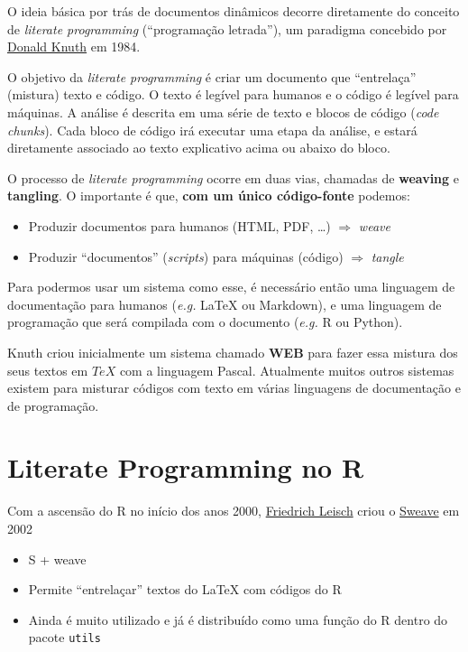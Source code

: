 \documentclass[10pt,a4paper]{book}
\providecommand{\tightlist}{%
  \setlength{\itemsep}{0pt}\setlength{\parskip}{0pt}}
\begin{document}
O ideia básica por trás de documentos dinâmicos decorre diretamente do
conceito de \emph{literate programming} (``programação letrada''), um
paradigma concebido por
\href{https://en.wikipedia.org/wiki/Donald_Knuth}{Donald Knuth} em 1984.

O objetivo da \emph{literate programming} é criar um documento que
``entrelaça'' (mistura) texto e código. O texto é legível para humanos e
o código é legível para máquinas. A análise é descrita em uma série de
texto e blocos de código (\emph{code chunks}). Cada bloco de código irá
executar uma etapa da análise, e estará diretamente associado ao texto
explicativo acima ou abaixo do bloco.

O processo de \emph{literate programming} ocorre em duas vias, chamadas
de \textbf{weaving} e \textbf{tangling}. O importante é que, \textbf{com
um único código-fonte} podemos:

\begin{itemize}
\tightlist
\item
  Produzir documentos para humanos (HTML, PDF, \ldots{}) \(\Rightarrow\)
  \emph{weave}
\item
  Produzir ``documentos'' (\emph{scripts}) para máquinas (código)
  \(\Rightarrow\) \emph{tangle}
\end{itemize}

Para podermos usar um sistema como esse, é necessário então uma
linguagem de documentação para humanos (\emph{e.g.} LaTeX ou Markdown),
e uma linguagem de programação que será compilada com o documento
(\emph{e.g.} R ou Python).

Knuth criou inicialmente um sistema chamado \textbf{WEB} para fazer essa
mistura dos seus textos em \(TeX\) com a linguagem Pascal. Atualmente
muitos outros sistemas existem para misturar códigos com texto em várias
linguagens de documentação e de programação.

\section{Literate Programming no R}\label{literate-programming-no-r}

Com a ascensão do R no início dos anos 2000,
\href{http://www.statistik.lmu.de/~leisch}{Friedrich Leisch} criou o
\href{https://www.statistik.lmu.de/~leisch/Sweave}{Sweave} em 2002

\begin{itemize}
\tightlist
\item
  S + weave
\item
  Permite ``entrelaçar'' textos do LaTeX com códigos do R
\item
  Ainda é muito utilizado e já é distribuído como uma função do R dentro
  do pacote \texttt{utils}
\end{itemize}
\end{document}
